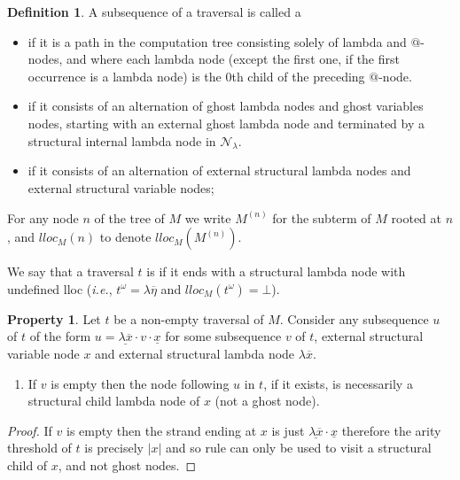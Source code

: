 \documentclass{article}
\makeatletter
\theoremstyle{definition}
\newtheorem{definition}{Definition}[section]
\newtheorem{property}{Property}[section]
\newcommand\Nodes{\mathcal{N}}%
\newcommand\NodesLmd{\Nodes_\lambda}%
\renewcommand\ie{{\it i.e.\@\xspace}}
\makeatother
\begin{document}
\begin{definition}
A subsequence of a traversal is called a
\begin{itemize}
\item {} if it is a path in the computation tree consisting solely of lambda and $@$-nodes, and where each lambda node (except the first one, if the first occurrence is a lambda node) is the $0$th child of the preceding $@$-node.
\item {} if it consists of an alternation of ghost lambda nodes and ghost variables nodes, starting with an external ghost lambda node and terminated by a structural internal lambda node in $\NodesLmd$.
\item {} if it consists of an alternation of external structural lambda nodes and external structural variable nodes;
\end{itemize}
\end{definition}

For any node $n$ of the tree of $M$ we write $M^{(n)}$ for the subterm of $M$ rooted at $n$, and $lloc_M(n)$ to denote $lloc_M(M^{(n)})$.

We say that a traversal $t$ is  if it ends with a structural lambda node with undefined lloc (\ie, $t^\omega = \lambda\overline\eta$ and $lloc_M(t^\omega) = \bot$).

\begin{property}
\label{prop:strand_spinaldescent}
Let $t$ be a non-empty traversal of $M$.
Consider any subsequence $u$ of $t$ of the form
$u = \underline{\lambda \overline{x}} \cdot v \cdot \underline{x}$
for some subsequence $v$ of $t$, external structural variable node $x$ and external structural lambda node $\lambda \overline{x}$.
\begin{enumerate}[label=(\roman*)]
  \item If $v$ is empty then the node following $u$ in $t$, if it exists, is necessarily a structural child lambda node of $x$ (not a ghost node).
\end{enumerate}
\end{property}
\begin{proof}
 If $v$ is empty then the strand ending at $x$
 is just $\underline{\lambda \overline{x}} \cdot \underline{x}$ therefore
 the arity threshold of $t$ is precisely $|x|$ and so rule  can only be used to visit a structural child of $x$, and not ghost nodes.
\end{proof}
\end{document}
